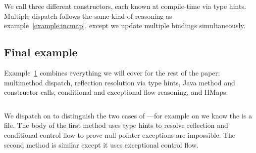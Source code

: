 We call three different  constructors, each known at compile-time
via type hints.
Multiple dispatch follows the same kind of reasoning as example~\ref{example:incmap},
except we update multiple bindings simultaneously.

\subsection{Final example}

Example~\ref{example:final}
combines everything we will cover for the rest of the paper:
multimethod dispatch, reflection resolution via type hints, Java method
and constructor calls, conditional and exceptional flow reasoning,
and HMaps. 

\begin{figure}
\begin{exmp}
\inputminted[firstline=6,lastline=20]{clojure}{code/demo/src/demo/eg8.clj}
\label{example:final}
\end{exmp}
\end{figure}

We dispatch on  to distinguish the two cases of ---for example on 
we know the  is a file.
The body of the first method uses type hints to resolve reflection
and conditional control flow to prove null-pointer exceptions are impossible.
The second method is similar except it uses exceptional control flow.









